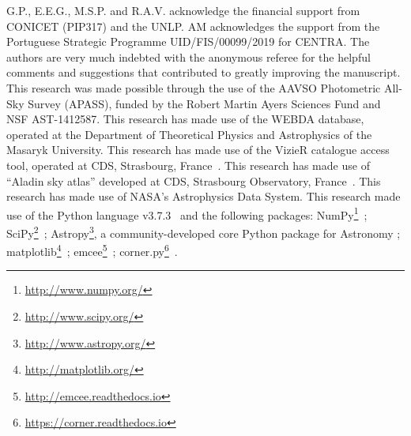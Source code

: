 \documentclass[draft]{aa}
\begin{document}
\begin{acknowledgements}

G.P., E.E.G., M.S.P. and R.A.V. acknowledge the financial support from CONICET 
(PIP317) and the UNLP.
AM acknowledges the support from the Portuguese Strategic Programme
UID/FIS/00099/2019 for CENTRA.
The authors are very much indebted with the anonymous referee for the helpful
comments and suggestions that contributed to greatly improving the manuscript.
%
This research was made possible through the use of the AAVSO Photometric
All-Sky Survey (APASS), funded by the Robert Martin Ayers Sciences Fund and NSF
AST-1412587.
%
This research has made use of the WEBDA database, operated at the Department of
Theoretical Physics and Astrophysics of the Masaryk University.
%
This research has made use of the VizieR catalogue access tool, operated at CDS,
Strasbourg, France~\citep{Ochsenbein_2000}.
%
This research has made use of ``Aladin sky atlas'' developed at
CDS, Strasbourg Observatory, France~\citep{Bonnarel2000,Boch2014}.
%
This research has made use of NASA's Astrophysics Data System.
%
This research made use of the Python language v3.7.3~\citep{vanRossum_1995}
and the following packages:
NumPy\footnote{\url{http://www.numpy.org/}}~\citep{vanDerWalt_2011};
SciPy\footnote{\url{http://www.scipy.org/}}~\citep{Jones_2001};
Astropy\footnote{\url{http://www.astropy.org/}}, a community-developed core
Python package for Astronomy \citep{Astropy_2013};
matplotlib\footnote{\url{http://matplotlib.org/}}~\citep{hunter_2007};
emcee\footnote{\url{http://emcee.readthedocs.io}}~\citep{emcee};
corner.py\footnote{\url{https://corner.readthedocs.io}}~\citep{corner}.
\end{acknowledgements}



\end{document}
